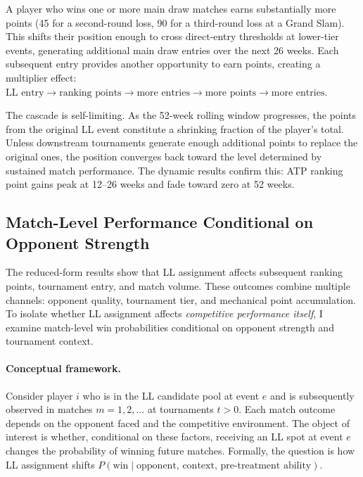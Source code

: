 A player who wins one or more main draw matches earns substantially more points (45 for a second-round loss, 90 for a third-round loss at a Grand Slam). This shifts their position enough to cross direct-entry thresholds at lower-tier events, generating additional main draw entries over the next 26 weeks. Each subsequent entry provides another opportunity to earn points, creating a multiplier effect: $\text{LL entry} \to \text{ranking points} \to \text{more entries} \to \text{more points} \to \text{more entries}$.

The cascade is self-limiting. As the 52-week rolling window progresses, the points from the original LL event constitute a shrinking fraction of the player's total. Unless downstream tournaments generate enough additional points to replace the original ones, the position converges back toward the level determined by sustained match performance. The dynamic results confirm this: ATP ranking point gains peak at 12--26 weeks and fade toward zero at 52 weeks.

\subsection{Match-Level Performance Conditional on Opponent Strength}
\label{sec:mechanisms_performance}

The reduced-form results show that LL assignment affects subsequent ranking points, tournament entry, and match volume. These outcomes combine multiple channels: opponent quality, tournament tier, and mechanical point accumulation. To isolate whether LL assignment affects \textit{competitive performance itself}, I examine match-level win probabilities conditional on opponent strength and tournament context.

\paragraph{Conceptual framework.} Consider player $i$ who is in the LL candidate pool at event $e$ and is subsequently observed in matches $m = 1, 2, \ldots$ at tournaments $t > 0$. Each match outcome depends on the opponent faced and the competitive environment. The object of interest is whether, conditional on these factors, receiving an LL spot at event $e$ changes the probability of winning future matches. Formally, the question is how LL assignment shifts $P(\text{win} \mid \text{opponent, context, pre-treatment ability})$.

